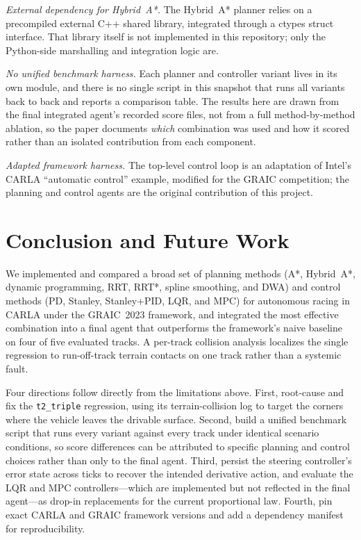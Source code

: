 \documentclass[conference]{IEEEtran}
\begin{document}
\emph{External dependency for Hybrid~A*.} The Hybrid~A* planner relies on a
precompiled external C++ shared library, integrated through a ctypes struct
interface. That library itself is not implemented in this repository; only the
Python-side marshalling and integration logic are.

\emph{No unified benchmark harness.} Each planner and controller variant lives
in its own module, and there is no single script in this snapshot that runs all
variants back to back and reports a comparison table. The results here are drawn
from the final integrated agent's recorded score files, not from a full
method-by-method ablation, so the paper documents \emph{which} combination was
used and how it scored rather than an isolated contribution from each component.

\emph{Adapted framework harness.} The top-level control loop is an adaptation of
Intel's CARLA ``automatic control'' example, modified for the GRAIC competition;
the planning and control agents are the original contribution of this project.

\section{Conclusion and Future Work}

We implemented and compared a broad set of planning methods (A*, Hybrid~A*,
dynamic programming, RRT, RRT*, spline smoothing, and DWA) and control methods
(PD, Stanley, Stanley+PID, LQR, and MPC) for autonomous racing in CARLA under
the GRAIC~2023 framework, and integrated the most effective combination into a
final agent that outperforms the framework's naive baseline on four of five
evaluated tracks. A per-track collision analysis localizes the single
regression to run-off-track terrain contacts on one track rather than a
systemic fault.

Four directions follow directly from the limitations above. First, root-cause
and fix the \texttt{t2\_triple} regression, using its terrain-collision log to
target the corners where the vehicle leaves the drivable surface. Second, build
a unified benchmark script that runs every variant against every track under
identical scenario conditions, so score differences can be attributed to
specific planning and control choices rather than only to the final agent.
Third, persist the steering controller's error state across ticks to recover the
intended derivative action, and evaluate the LQR and MPC controllers---which are
implemented but not reflected in the final agent---as drop-in replacements for
the current proportional law. Fourth, pin exact CARLA and GRAIC framework
versions and add a dependency manifest for reproducibility.
\end{document}
